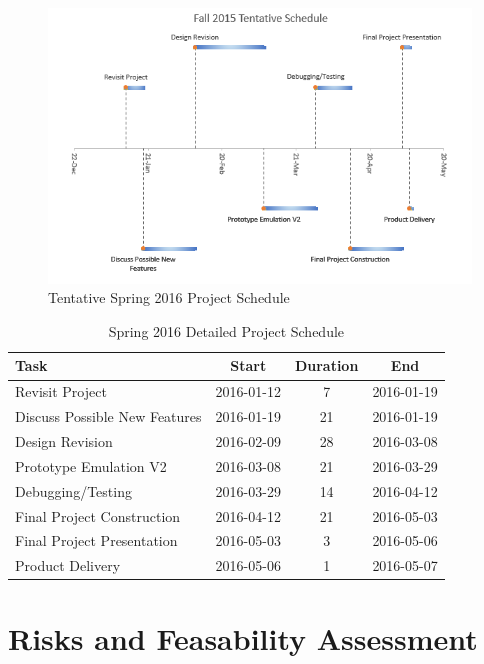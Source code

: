 \begin{figure}
\centering
\includegraphics[scale=0.65]{./figures/spring-timeline}
\caption{Tentative Spring 2016 Project Schedule}
\label{figure:fall-timeline}
\end{figure}

\begin{table}
\centering
\begin{tabular}{l  c  c  c}
Task & Start & Duration & End \\
\hline
Revisit Project	& 2016-01-12 & 7 & 2016-01-19 \\
Discuss Possible New Features & 2016-01-19 & 21 & 2016-01-19 \\
Design Revision & 2016-02-09 & 28 & 2016-03-08 \\
Prototype Emulation V2 & 2016-03-08 & 21 & 2016-03-29 \\
Debugging/Testing & 2016-03-29 & 14 & 2016-04-12 \\
Final Project Construction & 2016-04-12 & 21 & 2016-05-03 \\
Final Project Presentation & 2016-05-03 & 3 & 2016-05-06 \\
Product Delivery & 2016-05-06 & 1 & 2016-05-07 \\
\end{tabular}
\caption{Spring 2016 Detailed Project Schedule}
\label{table:risk}
\end{table}
\vspace{0.3cm}


\section{Risks and Feasability Assessment}

